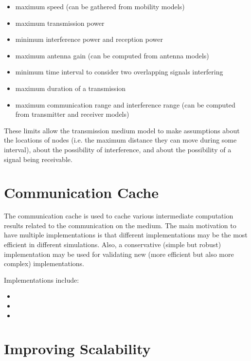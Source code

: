 \begin{itemize}
    \item maximum speed (can be gathered from mobility models)
    \item maximum transmission power
    \item minimum interference power and reception power
    \item maximum antenna gain (can be computed from antenna models)
    \item minimum time interval to consider two overlapping signals interfering
    \item maximum duration of a transmission
    \item maximum communication range and interference range 
      (can be computed from transmitter and receiver models)
\end{itemize}

These limits allow the transmission medium model to make assumptions about the
locations of nodes (i.e. the maximum distance they can move during some
interval), about the possibility of interference, and about the possibility
of a signal being receivable.


\section{Communication Cache}

The communication cache is used to cache various intermediate computation
results related to the communication on the medium. The main motivation to have
multiple implementations is that different implementations may be the most
efficient in different simulations. Also, a conservative (simple but robust)
implementation may be used for validating new (more efficient but also more
complex) implementations.

Implementations include:

\begin{itemize}
  \item {}
  \item {}
  \item {}
\end{itemize}


\section{Improving Scalability}

